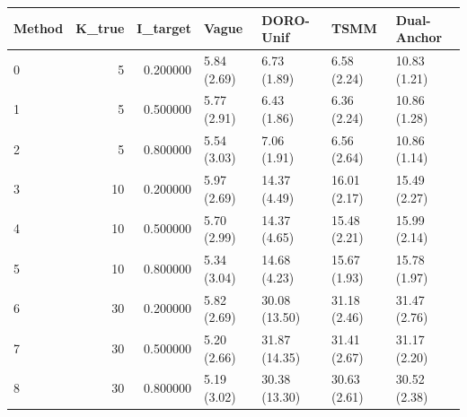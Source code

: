 \begin{tabular}{lrrllll}
\toprule
Method & K_true & I_target & Vague & DORO-Unif & TSMM & Dual-Anchor \\
\midrule
0 & 5 & 0.200000 & 5.84 (2.69) & 6.73 (1.89) & 6.58 (2.24) & 10.83 (1.21) \\
1 & 5 & 0.500000 & 5.77 (2.91) & 6.43 (1.86) & 6.36 (2.24) & 10.86 (1.28) \\
2 & 5 & 0.800000 & 5.54 (3.03) & 7.06 (1.91) & 6.56 (2.64) & 10.86 (1.14) \\
3 & 10 & 0.200000 & 5.97 (2.69) & 14.37 (4.49) & 16.01 (2.17) & 15.49 (2.27) \\
4 & 10 & 0.500000 & 5.70 (2.99) & 14.37 (4.65) & 15.48 (2.21) & 15.99 (2.14) \\
5 & 10 & 0.800000 & 5.34 (3.04) & 14.68 (4.23) & 15.67 (1.93) & 15.78 (1.97) \\
6 & 30 & 0.200000 & 5.82 (2.69) & 30.08 (13.50) & 31.18 (2.46) & 31.47 (2.76) \\
7 & 30 & 0.500000 & 5.20 (2.66) & 31.87 (14.35) & 31.41 (2.67) & 31.17 (2.20) \\
8 & 30 & 0.800000 & 5.19 (3.02) & 30.38 (13.30) & 30.63 (2.61) & 30.52 (2.38) \\
\bottomrule
\end{tabular}

